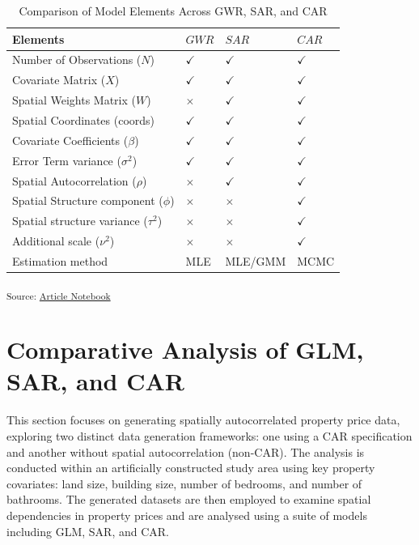 \documentclass[
  default,
]{sn-jnl}
\begin{document}
\begin{longtable}[t]{llll}

\caption{\label{tbl-summarymethod}Comparison of Model Elements Across
GWR, SAR, and CAR}

\tabularnewline

\toprule
Elements & $GWR$ & $SAR$ & $CAR$\\
\midrule
Number of Observations ($N$) & $\checkmark$ & $\checkmark$ & $\checkmark$\\
Covariate Matrix ($X$) & $\checkmark$ & $\checkmark$ & $\checkmark$\\
Spatial Weights Matrix ($W$) & $\times$ & $\checkmark$ & $\checkmark$\\
Spatial Coordinates (coords) & $\checkmark$ & $\checkmark$ & $\checkmark$\\
Covariate Coefficients ($\beta$) & $\checkmark$ & $\checkmark$ & $\checkmark$\\
\addlinespace
Error Term variance ($\sigma^2$) & $\checkmark$ & $\checkmark$ & $\checkmark$\\
Spatial Autocorrelation ($\rho$) & $\times$ & $\checkmark$ & $\checkmark$\\
Spatial Structure component ($\phi$) & $\times$ & $\times$ & $\checkmark$\\
Spatial structure variance ($\tau^2$) & $\times$ & $\times$ & $\checkmark$\\
Additional scale ($\nu^2$) & $\times$ & $\times$ & $\checkmark$\\
\addlinespace
Estimation method & MLE & MLE/GMM & MCMC\\
\bottomrule

\end{longtable}

\endgroup{}

\textsubscript{Source:
\href{https://indiraputeri-phd.github.io/CAR_simcomp/manuscript.qmd.html}{Article
Notebook}}

\section{Comparative Analysis of GLM, SAR, and
CAR}\label{comparative-analysis-of-glm-sar-and-car}

This section focuses on generating spatially autocorrelated property
price data, exploring two distinct data generation frameworks: one using
a CAR specification and another without spatial autocorrelation
(non-CAR). The analysis is conducted within an artificially constructed
study area using key property covariates: land size, building size,
number of bedrooms, and number of bathrooms. The generated datasets are
then employed to examine spatial dependencies in property prices and are
analysed using a suite of models including GLM, SAR, and CAR.
\end{document}
